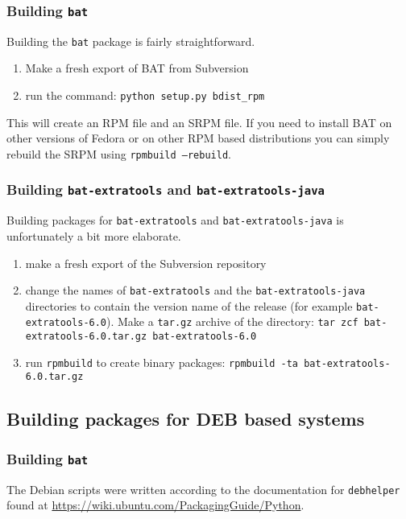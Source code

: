 \documentclass[10pt]{article}
\begin{document}
\subsubsection{Building \texttt{bat}}

Building the \texttt{bat} package is fairly straightforward.

\begin{enumerate}
\item Make a fresh export of BAT from Subversion
\item run the command: \texttt{python setup.py bdist\_rpm}
\end{enumerate}

This will create an RPM file and an SRPM file. If you need to install BAT on
other versions of Fedora or on other RPM based distributions you can simply
rebuild the SRPM using \texttt{rpmbuild --rebuild}.

\subsubsection{Building \texttt{bat-extratools} and
\texttt{bat-extratools-java}}

Building packages for \texttt{bat-extratools} and \texttt{bat-extratools-java}
is unfortunately a bit more elaborate.

\begin{enumerate}
\item make a fresh export of the Subversion repository
\item change the names of \texttt{bat-extratools} and the
\texttt{bat-extratools-java} directories to contain the version name of the
release (for example \texttt{bat-extratools-6.0}). Make a \texttt{tar.gz}
archive of the directory:
\texttt{tar zcf bat-extratools-6.0.tar.gz bat-extratools-6.0}
\item run \texttt{rpmbuild} to create binary packages:
\texttt{rpmbuild -ta bat-extratools-6.0.tar.gz}
\end{enumerate}

\subsection{Building packages for DEB based systems}

\subsubsection{Building \texttt{bat}}

The Debian scripts were written according to the documentation for
\texttt{debhelper} found at \url{https://wiki.ubuntu.com/PackagingGuide/Python}.
\end{document}
